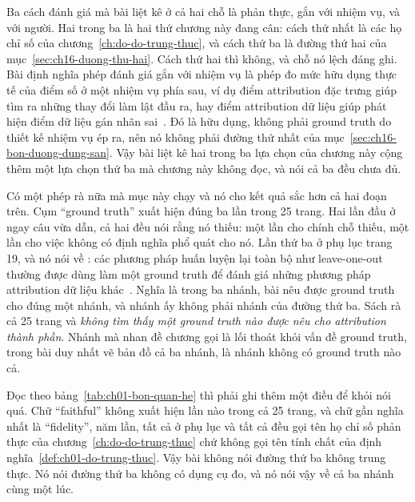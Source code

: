%
Ba cách đánh giá mà bài liệt kê ở cả hai chỗ là phản thực, gắn với nhiệm vụ, và
với người. Hai trong ba là hai thứ chương này đang cân: cách thứ nhất là các họ
chỉ số của chương~\ref{ch:do-do-trung-thuc}, và cách thứ ba là đường thứ hai của
mục~\ref{sec:ch16-duong-thu-hai}. Cách thứ hai thì không, và chỗ nó lệch đáng
ghi. Bài định nghĩa phép đánh giá gắn với nhiệm vụ là phép đo mức hữu dụng thực
tế của điểm số ở một nhiệm vụ phía sau, ví dụ điểm attribution đặc trưng giúp
tìm ra những thay đổi làm lật đầu ra, hay điểm attribution dữ liệu giúp phát
hiện điểm dữ liệu gán nhãn sai~\autocite{p18unified}. Đó là hữu dụng, không phải
ground truth do thiết kế nhiệm vụ ép ra, nên nó không phải đường thứ nhất của
mục~\ref{sec:ch16-bon-duong-dung-san}. Vậy bài liệt kê hai trong ba lựa chọn của
chương này cộng thêm một lựa chọn thứ ba mà chương này không đọc, và nói cả ba
đều chưa đủ.

%
Có một phép rà nữa mà mục này chạy và nó cho kết quả sắc hơn cả hai đoạn trên.
Cụm \enquote{ground truth} xuất hiện đúng ba lần trong 25 trang. Hai lần đầu ở
ngay câu vừa dẫn, cả hai đều nói rằng nó thiếu: một lần cho chính chỗ thiếu, một
lần cho việc không có định nghĩa phổ quát cho nó. Lần thứ ba ở phụ lục trang 19,
và nó nói
về : các phương pháp huấn luyện lại
toàn bộ như leave-one-out thường được dùng làm một ground truth để đánh giá
những phương pháp attribution dữ liệu khác~\autocite{p18unified}. Nghĩa là trong
ba nhánh, bài nêu được ground truth cho đúng một nhánh, và nhánh ấy không phải
nhánh của đường thứ ba. Sách rà cả 25 trang và \emph{không tìm thấy một ground
truth nào được nêu cho attribution thành phần}. Nhánh mà nhan đề chương gọi là
lối thoát khỏi vấn đề ground truth, trong bài duy nhất vẽ bản đồ cả ba nhánh, là
nhánh không có ground truth nào cả.

%
Đọc theo bảng~\ref{tab:ch01-bon-quan-he} thì phải ghi thêm một điều để khỏi nói
quá. Chữ \enquote{faithful} không xuất hiện lần nào trong cả 25 trang, và chữ
gần nghĩa nhất là \enquote{fidelity}, năm lần, tất cả ở phụ lục và tất cả đều
gọi tên họ chỉ số phản thực của chương~\ref{ch:do-do-trung-thuc} chứ không gọi
tên tính chất của định nghĩa~\ref{def:ch01-do-trung-thuc}. Vậy bài không nói
đường thứ ba không trung thực. Nó nói đường thứ ba không có dụng cụ đo, và nó
nói vậy về cả ba nhánh cùng một lúc.

